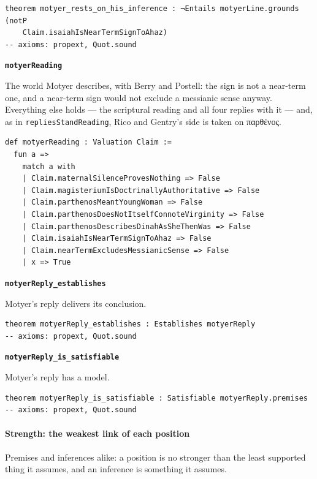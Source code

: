 \documentclass[11pt]{article}
\begin{document}
{\small\begin{verbatim}
theorem motyer_rests_on_his_inference : ¬Entails motyerLine.grounds (notP
    Claim.isaiahIsNearTermSignToAhaz)
-- axioms: propext, Quot.sound
\end{verbatim}}
\par\medskip\noindent\textbf{\texttt{motyer\allowbreak{}Reading}}\par\nobreak\noindent
The world Motyer describes, with Berry and Postell: the sign is not a near-term one, and a near-term sign would not exclude a messianic sense anyway. Everything else holds — the scriptural reading and all four replies with it — and, as in \texttt{replies\allowbreak{}Stand\allowbreak{}Reading}, Rico and Gentry’s side is taken on παρθένος.

{\small\begin{verbatim}
def motyerReading : Valuation Claim :=
  fun a =>
    match a with
    | Claim.maternalSilenceProvesNothing => False
    | Claim.magisteriumIsDoctrinallyAuthoritative => False
    | Claim.parthenosMeantYoungWoman => False
    | Claim.parthenosDoesNotItselfConnoteVirginity => False
    | Claim.parthenosDescribesDinahAsSheThenWas => False
    | Claim.isaiahIsNearTermSignToAhaz => False
    | Claim.nearTermExcludesMessianicSense => False
    | x => True
\end{verbatim}}
\par\medskip\noindent\textbf{\texttt{motyer\allowbreak{}Reply\_\allowbreak{}establishes}}\par\nobreak\noindent
Motyer’s reply delivers its conclusion.

{\small\begin{verbatim}
theorem motyerReply_establishes : Establishes motyerReply
-- axioms: propext, Quot.sound
\end{verbatim}}
\par\medskip\noindent\textbf{\texttt{motyer\allowbreak{}Reply\_\allowbreak{}is\_\allowbreak{}satisfiable}}\par\nobreak\noindent
Motyer’s reply has a model.

{\small\begin{verbatim}
theorem motyerReply_is_satisfiable : Satisfiable motyerReply.premises
-- axioms: propext, Quot.sound
\end{verbatim}}
\paragraph*{Strength: the weakest link of each position}
\leavevmode\par\nobreak
Premises and inferences alike: a position is no stronger than the least supported thing it assumes, and an inference is something it assumes.
\end{document}
